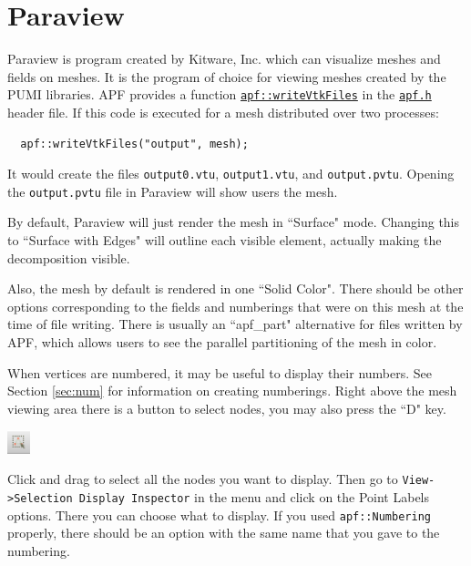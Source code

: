 \documentclass{article}
\begin{document}
\appendix

\section{Paraview}
\label{sec:paraview}

Paraview is program created by Kitware, Inc. which can visualize meshes
and fields on meshes.
It is the program of choice for viewing meshes created by the PUMI libraries.
APF provides a function
\href{http://scorec.rpi.edu/~dibanez/core/namespaceapf.html#a060af76b0bb25bffe37dc7a20e121936}{\texttt{apf::writeVtkFiles}}
in the
\href{https://github.com/SCOREC/core/blob/master/apf/apf.h}{\texttt{apf.h}}
header file.
If this code is executed for a mesh distributed over two processes:

\begin{lstlisting}
  apf::writeVtkFiles("output", mesh);
\end{lstlisting}

It would create the files \texttt{output0.vtu}, \texttt{output1.vtu},
and \texttt{output.pvtu}.
Opening the \texttt{output.pvtu} file in Paraview will show users the
mesh.

By default, Paraview will just render the mesh in ``Surface" mode.
Changing this to ``Surface with Edges" will outline each visible element,
actually making the decomposition visible.

Also, the mesh by default is rendered in one ``Solid Color".
There should be other options corresponding to the fields and numberings
that were on this mesh at the time of file writing.
There is usually an ``apf\_part" alternative for files written by APF, which
allows users to see the parallel partitioning of the mesh in color.

When vertices are numbered, it may be useful to display their numbers.
See Section \ref{sec:num} for information on creating numberings.
Right above the mesh viewing area there is a button to select nodes,
you may also press the ``D" key.

\begin{center}
\includegraphics[width=0.05\textwidth]{select_nodes.png}
\end{center}

Click and drag to select all the nodes you want to display.
Then go to \texttt{View->Selection Display Inspector} in the menu and click on
the Point Labels options.
There you can choose what to display.
If you used \texttt{apf::Numbering} properly, there should be an option
with the same name that you gave to the numbering.
\end{document}
